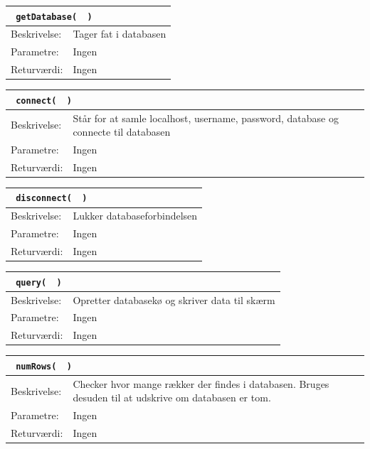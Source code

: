 \begin{table}[H]
\begin{tabular}{l p{12.5cm}}
\multicolumn{2}{l}{\texttt{\textcolor{blue}{} getDatabase( \textcolor{blue}{} )}} \\
\hline
Beskrivelse: & Tager fat i databasen\\
Parametre: & Ingen\\
Returværdi: & Ingen\\
\end{tabular}
\end{table}

\begin{table}[H]
\begin{tabular}{l p{12.5cm}}
\multicolumn{2}{l}{\texttt{\textcolor{blue}{} connect( \textcolor{blue}{} )}} \\
\hline
Beskrivelse: & Står for at samle localhost, username, password, database og connecte til databasen\\
Parametre: & Ingen\\
Returværdi: & Ingen\\
\end{tabular}
\end{table}

\begin{table}[H]
\begin{tabular}{l p{12.5cm}}
\multicolumn{2}{l}{\texttt{\textcolor{blue}{} disconnect( \textcolor{blue}{} )}} \\
\hline
Beskrivelse: & Lukker databaseforbindelsen\\
Parametre: & Ingen\\
Returværdi: & Ingen\\
\end{tabular}
\end{table}

\begin{table}[H]
\begin{tabular}{l p{12.5cm}}
\multicolumn{2}{l}{\texttt{\textcolor{blue}{} query( \textcolor{blue}{} )}} \\
\hline
Beskrivelse: & Opretter databasekø og skriver data til skærm\\
Parametre: & Ingen\\
Returværdi: & Ingen\\
\end{tabular}
\end{table}

\begin{table}[H]
\begin{tabular}{l p{12.5cm}}
\multicolumn{2}{l}{\texttt{\textcolor{blue}{} numRows( \textcolor{blue}{} )}} \\
\hline
Beskrivelse: & Checker hvor mange rækker der findes i databasen. Bruges desuden til at udskrive om databasen er tom.\\
Parametre: & Ingen\\
Returværdi: & Ingen\\
\end{tabular}
\end{table}

